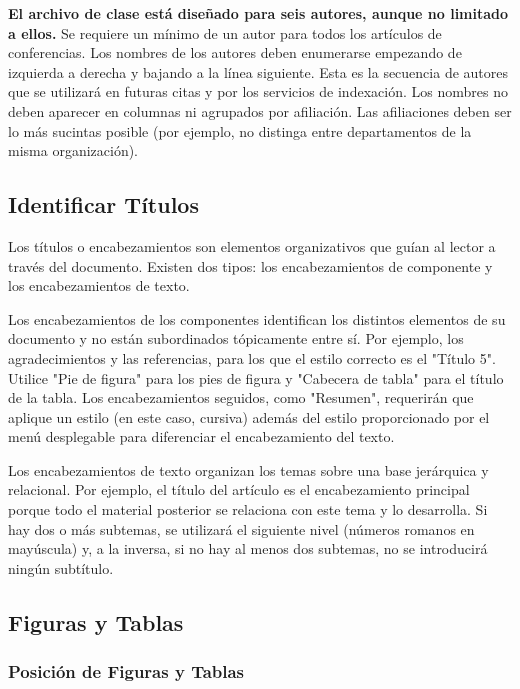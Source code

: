\textbf{El archivo de clase está diseñado para seis autores, aunque no limitado a ellos.} Se requiere un mínimo de un autor para todos los artículos de conferencias. Los nombres de los autores deben enumerarse empezando de izquierda a derecha y bajando a la línea siguiente. Esta es la secuencia de autores que se utilizará en futuras citas y por los servicios de indexación. Los nombres no deben aparecer en columnas ni agrupados por afiliación. Las afiliaciones deben ser lo más sucintas posible (por ejemplo, no distinga entre departamentos de la misma organización).

\subsection{Identificar Títulos} \label{subsec:ident_titul}

Los títulos o encabezamientos son elementos organizativos que guían al lector a través del documento. Existen dos tipos: los encabezamientos de componente y los encabezamientos de texto. \par

Los encabezamientos de los componentes identifican los distintos elementos de su documento y no están subordinados tópicamente entre sí. Por ejemplo, los agradecimientos y las referencias, para los que el estilo correcto es el "Título 5". Utilice "Pie de figura" para los pies de figura y "Cabecera de tabla" para el título de la tabla. Los encabezamientos seguidos, como "Resumen", requerirán que aplique un estilo (en este caso, cursiva) además del estilo proporcionado por el menú desplegable para diferenciar el encabezamiento del texto. \par

Los encabezamientos de texto organizan los temas sobre una base jerárquica y relacional. Por ejemplo, el título del artículo es el encabezamiento principal porque todo el material posterior se relaciona con este tema y lo desarrolla. Si hay dos o más subtemas, se utilizará el siguiente nivel (números romanos en mayúscula) y, a la inversa, si no hay al menos dos subtemas, no se introducirá ningún subtítulo.

\subsection{Figuras y Tablas} \label{subsec:fig_tab}

\subsubsection{Posición de Figuras y Tablas} \label{subsubsec:posic_fig_tab}

